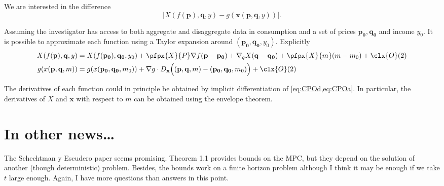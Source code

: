 \documentclass[english, a4paper,12pt]{article}
\begin{document}
We are interested in the difference
	$$\Big| X(f(\mathbf{p}), \mathbf{q}, y) - g(\mathbf{x}(\mathbf{p}, \mathbf{q}, y)) \Big|.$$

Assuming the investigator has access to both aggregate and disaggregate data in consumption and a set of prices $\mathbf{p_{0}}, \mathbf{q_{0}}$ and income $y_{0}$. It is possible to approximate each function using a Taylor expansion around $(\mathbf{p_{0}}, \mathbf{q_{0}}, y_{0})$. Explicitly
	\begin{align*}
		X(f(\mathbf{p}), \mathbf{q}, y)
			&=	X(f(\mathbf{p_{0}}), \mathbf{q_{0}}, y_{0})
					+ \pfpx{X}{P} \nabla f (\mathbf{p} - \mathbf{p_{0}})
					+ \nabla_{q} X (\mathbf{q} - \mathbf{q_{0}})
					+ \pfpx{X}{m}(m - m_{0}) + \clx{O}(2)	\\
		g(x(\mathbf{p}, \mathbf{q}, m))
			&=	g(x(\mathbf{p_{0}}, \mathbf{q_{0}}, m_{0})) + \nabla g \cdot D_{\mathbf{x}} \Big((\mathbf{p}, \mathbf{q}, m) - (\mathbf{p_{0}}, \mathbf{q_{0}}, m_{0})\Big) + \clx{O}(2)
	\end{align*}

The derivatives of each function could in principle be obtained by implicit differentiation of \cref{eq:CPOd,eq:CPOa}. In particular, the derivatives of $X$ and $\mathbf{x}$ with respect to $m$ can be obtained using the envelope theorem.

\section{In other news\ldots}
The Schechtman y Escudero paper seems promising. Theorem 1.1 provides bounds on the MPC, but they depend on the solution of another (though deterministic) problem. Besides, the bounds work on a finite horizon problem although I think it may be enough if we take $t$ large enough. Again, I have more questions than answers in this point.



\end{document}
